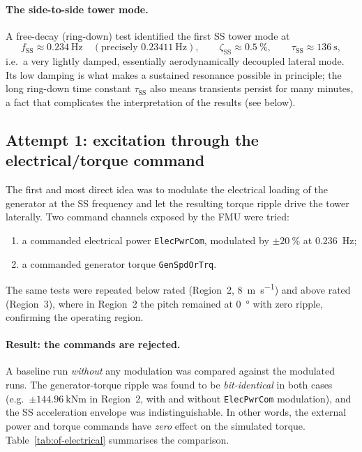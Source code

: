 \paragraph{The side-to-side tower mode.}
A free-decay (ring-down) test identified the first SS tower mode at
\begin{equation}
  f_{\mathrm{SS}} \approx \SI{0.234}{\hertz}
  \quad(\text{precisely } \SI{0.23411}{\hertz}),
  \qquad \zeta_{\mathrm{SS}} \approx \SI{0.5}{\percent},
  \qquad \tau_{\mathrm{SS}} \approx \SI{136}{\second},
  \label{eq:ss-mode}
\end{equation}
i.e.\ a very lightly damped, essentially aerodynamically decoupled lateral mode.
Its low damping is what makes a sustained resonance possible in principle; the
long ring-down time constant $\tau_{\mathrm{SS}}$ also means transients persist
for many minutes, a fact that complicates the interpretation of the results
(see below).

\subsection{Attempt 1: excitation through the electrical/torque command}
\label{subsec:of-electrical}

The first and most direct idea was to modulate the electrical loading of the
generator at the SS frequency and let the resulting torque ripple drive the
tower laterally. Two command channels exposed by the FMU were tried:
\begin{enumerate}
  \item a commanded electrical power \texttt{ElecPwrCom}, modulated by
  $\pm\SI{20}{\percent}$ at \SI{0.236}{\hertz};
  \item a commanded generator torque \texttt{GenSpdOrTrq}.
\end{enumerate}
The same tests were repeated below rated (Region~2, \SI{8}{\metre\per\second})
and above rated (Region~3), where in Region~2 the pitch remained at
\SI{0}{\degree} with zero ripple, confirming the operating region.

\paragraph{Result: the commands are rejected.}
A baseline run \emph{without} any modulation was compared against the modulated
runs. The generator-torque ripple was found to be \emph{bit-identical} in both
cases (e.g.\ $\pm\SI{144.96}{\kilo\newton\metre}$ in Region~2, with and without
\texttt{ElecPwrCom} modulation), and the SS acceleration envelope was
indistinguishable. In other words, the external power and torque commands have
\emph{zero} effect on the simulated torque. Table~\ref{tab:of-electrical}
summarises the comparison.

